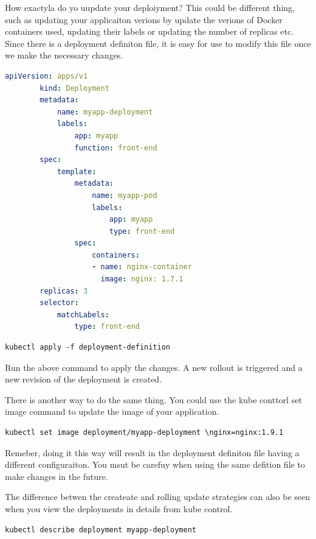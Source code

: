 \documentclass[11pt]{book}
\begin{document}
    How exactyla do yo uupdate your deploiyment?
    This could be different thing, such as updating your applicaiton verions by update the verions of Docker containers used, updating their labels or updating the number of replicas etc.
    Since there is a deployment definiton file, it is easy for use to modify this file once we make the necessary changes.

    \begin{lstlisting}[language=yaml, caption={Deployment example}]
        apiVersion: apps/v1
        kind: Deployment
        metadata:
            name: myapp-deployment
            labels:
                app: myapp
                function: front-end
        spec:
            template:
                metadata:
                    name: myapp-pod
                    labels:
                        app: myapp
                        type: front-end
                spec:
                    containers:
                    - name: nginx-container
                      image: nginx: 1.7.1
        replicas: 3
        selector:
            matchLabels:
                type: front-end
    \end{lstlisting}

    \begin{lstlisting}[language=terminal, caption={Commands}]
        kubectl apply -f deployment-definition
    \end{lstlisting}

    Run the above command to apply the changes.
    A new rollout is triggered and a new revision of the deployment is created.

    There is another way to do the same thing.
    You could use the kube conttorl set image command to update the image of your application.

    \begin{lstlisting}[language=terminal, caption={Commands}]
        kubectl set image deployment/myapp-deployment \nginx=nginx:1.9.1
    \end{lstlisting}

    Remeber, doing it this way will result in the deployment definiton file having a different configuraiton.
    You msut be carefuy when using the same defition file to make changes in the future.

    The difference betwen the createate and rolling update strategies can also be seen when you view the deployments in details from kube control.

    \begin{lstlisting}[language=terminal, caption={Commands}]
        kubectl describe deployment myapp-deployment
    \end{lstlisting}
\end{document}
